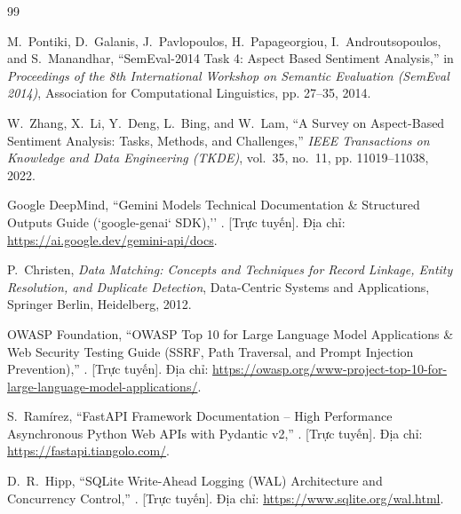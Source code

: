 \documentclass[12pt, a4paper]{article}
\begin{document}
\newpage
\begin{thebibliography}{99}

M.~Pontiki, D.~Galanis, J.~Pavlopoulos, H.~Papageorgiou, I.~Androutsopoulos, and S.~Manandhar,
\newblock ``SemEval-2014 Task 4: Aspect Based Sentiment Analysis,''
\newblock in \textit{Proceedings of the 8th International Workshop on Semantic Evaluation (SemEval 2014)}, Association for Computational Linguistics, pp. 27--35, 2014.

W.~Zhang, X.~Li, Y.~Deng, L.~Bing, and W.~Lam,
\newblock ``A Survey on Aspect-Based Sentiment Analysis: Tasks, Methods, and Challenges,''
\newblock \textit{IEEE Transactions on Knowledge and Data Engineering (TKDE)}, vol.~35, no.~11, pp. 11019--11038, 2022.

Google DeepMind,
\newblock ``Gemini Models Technical Documentation \& Structured Outputs Guide (`google-genai` SDK),''
. [Trực tuyến]. Địa chỉ: \url{https://ai.google.dev/gemini-api/docs}.

P.~Christen,
\newblock \textit{Data Matching: Concepts and Techniques for Record Linkage, Entity Resolution, and Duplicate Detection},
\newblock Data-Centric Systems and Applications, Springer Berlin, Heidelberg, 2012.

OWASP Foundation,
\newblock ``OWASP Top 10 for Large Language Model Applications \& Web Security Testing Guide (SSRF, Path Traversal, and Prompt Injection Prevention),''
. [Trực tuyến]. Địa chỉ: \url{https://owasp.org/www-project-top-10-for-large-language-model-applications/}.

S.~Ramírez,
\newblock ``FastAPI Framework Documentation -- High Performance Asynchronous Python Web APIs with Pydantic v2,''
. [Trực tuyến]. Địa chỉ: \url{https://fastapi.tiangolo.com/}.

D.~R.~Hipp,
\newblock ``SQLite Write-Ahead Logging (WAL) Architecture and Concurrency Control,''
. [Trực tuyến]. Địa chỉ: \url{https://www.sqlite.org/wal.html}.

\end{thebibliography}
\end{document}
